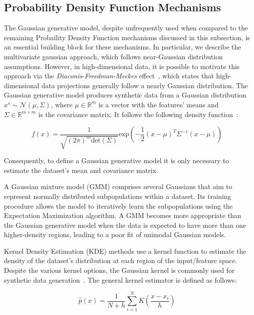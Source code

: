 \documentclass[parskip=full]{scrartcl}
\begin{document}
\subsection{Probability Density Function Mechanisms}

The Gaussian generative model, despite unfrequently used when compared to the
remaining Probaility Density Function mechanisms discussed in this subsection,
is an essential building block for these mechanisms. In particular, we
describe the multivariate gaussian approach, which follows near-Gaussian
distribution assumptions. However, in high-dimensional data, it is possible to
motivate this approach via the \textit{Diaconis-Freedman-Meckes}
effect~\cite{meckes2012projections}, which states that high-dimensional data
projections generally follow a nearly Gaussian distribution.  The Gaussian
generative model produces synthetic data from a Gaussian distribution $x^s
\sim \mathcal{N}(\mu, \Sigma)$, where $\mu \in \mathbb{R}^m$ is a vector with
the features' means and $\Sigma \in \mathbb{R}^{m \times m}$ is the covariance
matrix. It follows the following density function~\cite{chanyaswad2019ron}:

\begin{equation}\label{eq:gaussian}
    f(x) =
    \frac{1}{\sqrt{(2\pi)^m\text{det}(\Sigma)}}\text{exp}\left(-\frac{1}{2}(x-\mu)^T\Sigma^{-1}(x-\mu)\right)
\end{equation}

Consequently, to define a Gaussian generative model it is only necessary to
estimate the dataset's mean and covariance matrix.

A Gaussian mixture model (GMM) comprises several Gaussians that aim to represent
normally distributed subpopulations within a dataset. Its training procedure
allows the model to iteratively learn the subpopulations using the Expectation
Maximization algorithm. A GMM becomes more appropriate than the Gaussian
generative model when the data is expected to have more than one higher-density
regions, leading to a poor fit of unimodal Gaussian models.

Kernel Density Estimation (KDE) methods use a kernel function to estimate the
density of the dataset's distribution at each region of the input/feature
space. Despite the various kernel options, the Gaussian kernel is commonly
used for synthetic data generation~\cite{tang2015kerneladasyn}. The general
kernel estimator is defined as follows: 

\begin{equation}
    \hat{p}(x) = \frac{1}{N+h}
    \sum_{i=1}^{N}K\left(\frac{x-x_i}{h}\right)
\end{equation}
\end{document}
